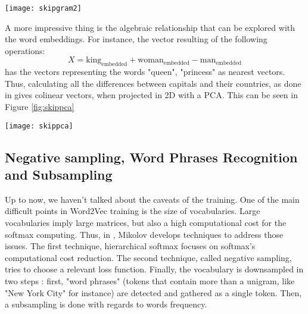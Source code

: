\documentclass{article}
\begin{document}
 
\begin{center}
    \label{fig:projector1}
    \texttt{[image: skipgram2]}
\end{center}

A more impressive thing is the algebraic relationship that can be explored with the word embeddings. 
For instance, the vector resulting of the following operations:
\[
X = \text{king}_{\text{embedded}} +  \text{woman}_{\text{embedded}} - \text{man}_{\text{embedded}}
\]
has the vectors representing the words "queen", "princess" as nearest vectors.
Thus, calculating all the differences between capitals and their countries, as done in 
\cite{NIPS2013_5021b} gives colinear vectors, when projected in 2D with a PCA. This can be 
seen in Figure \ref{fig:skippca}

\begin{center}
    \texttt{[image: skippca]}
    \label{fig:skippca}
\end{center}

\subsection{Negative sampling, Word Phrases Recognition and Subsampling \label{subsec:negsamp}}

Up to now, we haven't talked about the caveats of the training. One of the main difficult
points in Word2Vec training is the size of vocabularies. Large vocabularies imply large 
matrices, but also a high computational cost for the softmax computing. Thus, in \cite{NIPS2013_5021b},
Mikolov develops techniques to address those issues. The first technique, hierarchical 
softmax focuses on softmax's computational cost reduction. The second technique, called negative
sampling, tries to choose a relevant  loss function. Finally, 
the vocabulary is downsampled in two steps : first, "word phrases" (tokens that contain
more than a unigram, like "New York City" for instance) are detected and gathered as a single token.
Then, a subsampling is done with regards to words frequency. \\ \\
\end{document}
